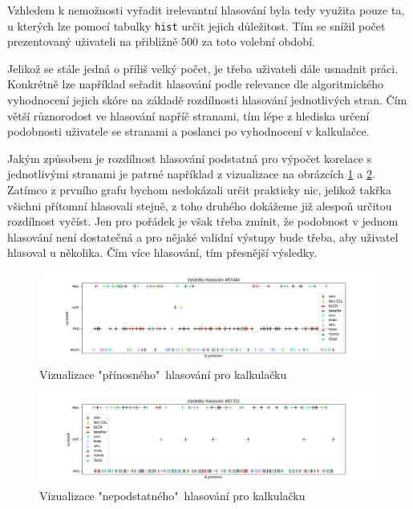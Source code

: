 \par Vzhledem k nemožnosti vyřadit irelevantní hlasování byla tedy využita pouze ta, u kterých lze pomocí tabulky \texttt{hist} určit jejich důležitost. Tím se snížil počet prezentovaný uživateli na přibližně 500 za toto volební období.\\ 

\par Jelikož se stále jedná o příliš velký počet, je třeba uživateli dále usnadnit práci. Konkrétně lze například seřadit hlasování podle relevance dle algoritmického vyhodnocení jejich skóre na základě rozdílnosti hlasování jednotlivých stran. Čím větší různorodost ve hlasování napříč stranami, tím lépe z hlediska určení podobnosti uživatele se stranami a poslanci po vyhodnocení v kalkulačce. \\

\par Jakým způsobem je rozdílnost hlasování podstatná pro výpočet korelace s jednotlivými stranami je patrné například z vizualizace na obrázcích \ref{fig:analyza-rozdilne} a \ref{fig:analyza-stejne}. Zatímco z prvního grafu bychom nedokázali určit prakticky nic, jelikož takřka všichni přítomní hlasovali stejně, z toho druhého dokážeme již alespoň určitou rozdílnost vyčíst. Jen pro pořádek je však třeba zmínit, že podobnost v jednom hlasování není dostatečná a pro nějaké validní výstupy bude třeba, aby uživatel hlasoval u několika. Čím více hlasování, tím přesnější výsledky.

\begin{figure}
    \centering
    \includegraphics[width=1\textwidth]{obrazky-figures/analyza_hl_rozdilne.png}
    \caption{Vizualizace "přínosného"\ hlasování pro kalkulačku}
    \label{fig:analyza-rozdilne}
\end{figure}

\begin{figure}
    \centering
    \includegraphics[width=1\textwidth]{obrazky-figures/analyza_hl_stejne.png}
    \caption{Vizualizace "nepodstatného"\ hlasování pro kalkulačku}
    \label{fig:analyza-stejne}
\end{figure}

